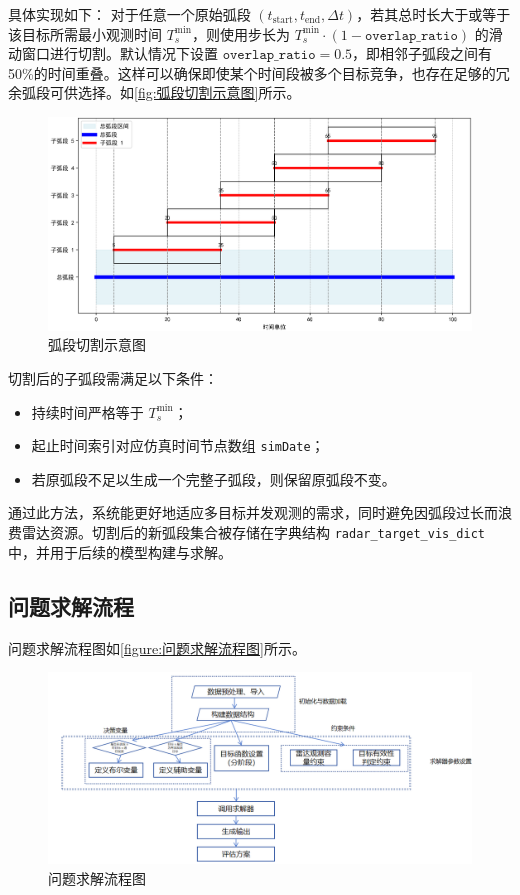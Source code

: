 \documentclass[openany,zihao=-4,UTF8]{ctexart}
\begin{document}
具体实现如下：  
对于任意一个原始弧段 $(t_{\text{start}}, t_{\text{end}}, \Delta t)$，若其总时长大于或等于该目标所需最小观测时间 $T_s^{\min}$，则使用步长为 $T_s^{\min} \cdot (1 - \texttt{overlap\_ratio})$ 的滑动窗口进行切割。默认情况下设置 $\texttt{overlap\_ratio}=0.5$，即相邻子弧段之间有50\%的时间重叠。这样可以确保即使某个时间段被多个目标竞争，也存在足够的冗余弧段可供选择。如\autoref{fig:弧段切割示意图}所示。

\begin{figure}[h]
    \centering
    \includegraphics[width=\columnwidth]{figures/弧段切割示意图.png}
    \caption{弧段切割示意图}
    \label{fig:弧段切割示意图}
\end{figure}

切割后的子弧段需满足以下条件：  
\begin{itemize}
    \item 持续时间严格等于 $T_s^{\min}$；
    \item 起止时间索引对应仿真时间节点数组 \texttt{simDate}；
    \item 若原弧段不足以生成一个完整子弧段，则保留原弧段不变。
\end{itemize}

通过此方法，系统能更好地适应多目标并发观测的需求，同时避免因弧段过长而浪费雷达资源。切割后的新弧段集合被存储在字典结构 \texttt{radar\_target\_vis\_dict} 中，并用于后续的模型构建与求解。

\subsection{问题求解流程}
问题求解流程图如\autoref{figure:问题求解流程图}所示。
\begin{figure}[h]\centering
    \includegraphics[width=\columnwidth]{figures/问题求解流程图.png}
    \caption{问题求解流程图}
    \label{figure:问题求解流程图}
\end{figure}
\end{document}
